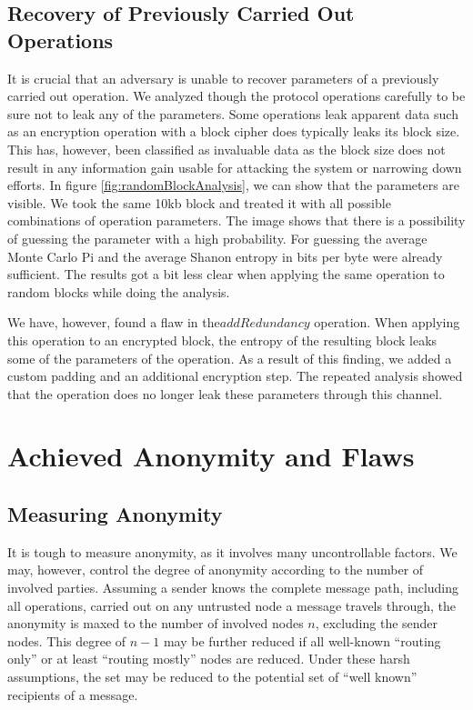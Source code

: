 \subsection{Recovery of Previously Carried Out Operations}
It is crucial that an adversary is unable to recover parameters of a previously carried out operation. We analyzed though the protocol operations carefully to be sure not to leak any of the parameters. Some operations leak apparent data such as an encryption operation with a block cipher does typically leaks its block size. This has, however, been classified as invaluable data as the block size does not result in any information gain usable for attacking the system or narrowing down efforts. In figure \ref{fig:randomBlockAnalysis}, we can show that the parameters are visible. We took the same 10kb block and treated it with all possible combinations of operation parameters. The image shows that there is a possibility of guessing the parameter with a high probability. For guessing the average Monte Carlo Pi and the average Shanon entropy in bits per byte were already sufficient. The results got a bit less clear when applying the same operation to random blocks while doing the analysis. 

We have, however, found a flaw in the$addRedundancy$ operation. When applying this operation to an encrypted block, the entropy of the resulting block leaks some of the parameters of the operation. As a result of this finding, we added a custom padding and an additional encryption step. The repeated analysis showed that the operation does no longer leak these parameters through this channel.


\section{Achieved Anonymity and Flaws}
\subsection{Measuring Anonymity}
It is tough to measure anonymity, as it involves many uncontrollable factors. We may, however, control the degree of anonymity according to the number of involved parties. Assuming a sender knows the complete message path, including all operations, carried out on any untrusted node a message travels through, the anonymity is maxed to the number of involved nodes $n$, excluding the sender nodes. This degree of $n-1$ may be further reduced if all well-known ``routing only'' or at least ``routing mostly'' nodes are reduced. Under these harsh assumptions, the set may be reduced to the potential set of ``well known'' recipients of a message.

